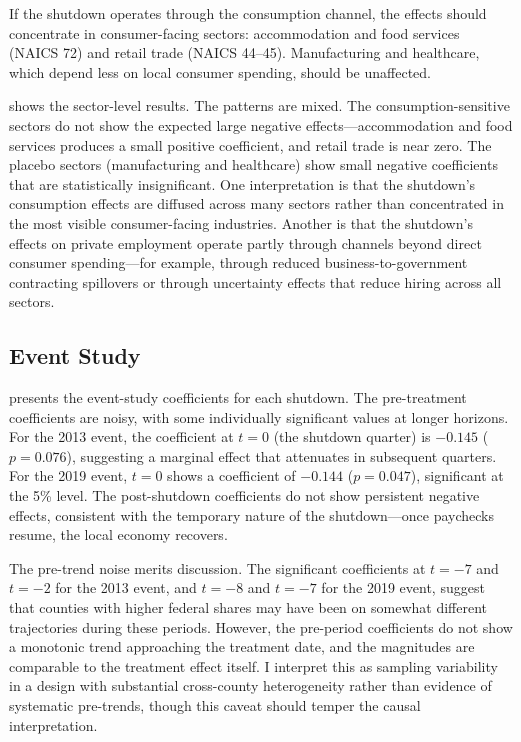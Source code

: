 \documentclass[12pt]{article}
\begin{document}
If the shutdown operates through the consumption channel, the effects should concentrate in consumer-facing sectors: accommodation and food services (NAICS 72) and retail trade (NAICS 44--45). Manufacturing and healthcare, which depend less on local consumer spending, should be unaffected.

 shows the sector-level results. The patterns are mixed. The consumption-sensitive sectors do not show the expected large negative effects---accommodation and food services produces a small positive coefficient, and retail trade is near zero. The placebo sectors (manufacturing and healthcare) show small negative coefficients that are statistically insignificant. One interpretation is that the shutdown's consumption effects are diffused across many sectors rather than concentrated in the most visible consumer-facing industries. Another is that the shutdown's effects on private employment operate partly through channels beyond direct consumer spending---for example, through reduced business-to-government contracting spillovers or through uncertainty effects that reduce hiring across all sectors.

{\small}

\subsection{Event Study}

 presents the event-study coefficients for each shutdown. The pre-treatment coefficients are noisy, with some individually significant values at longer horizons. For the 2013 event, the coefficient at $t = 0$ (the shutdown quarter) is $-0.145$ ($p = 0.076$), suggesting a marginal effect that attenuates in subsequent quarters. For the 2019 event, $t = 0$ shows a coefficient of $-0.144$ ($p = 0.047$), significant at the 5\% level. The post-shutdown coefficients do not show persistent negative effects, consistent with the temporary nature of the shutdown---once paychecks resume, the local economy recovers.

The pre-trend noise merits discussion. The significant coefficients at $t = -7$ and $t = -2$ for the 2013 event, and $t = -8$ and $t = -7$ for the 2019 event, suggest that counties with higher federal shares may have been on somewhat different trajectories during these periods. However, the pre-period coefficients do not show a monotonic trend approaching the treatment date, and the magnitudes are comparable to the treatment effect itself. I interpret this as sampling variability in a design with substantial cross-county heterogeneity rather than evidence of systematic pre-trends, though this caveat should temper the causal interpretation.
\end{document}
